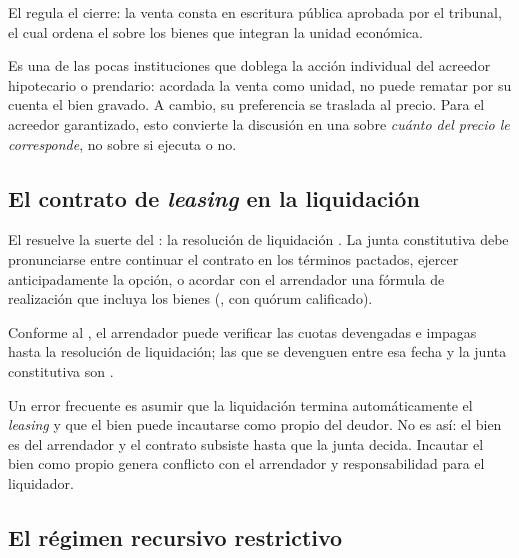 El  regula el cierre: la venta consta en escritura pública aprobada por el tribunal, el
cual ordena el  sobre
los bienes que integran la unidad económica.

\begin{foco}
Es una de las pocas instituciones que doblega la acción individual del acreedor hipotecario o
prendario: acordada la venta como unidad, no puede rematar por su cuenta el bien gravado. A
cambio, su preferencia se traslada al precio. Para el acreedor garantizado, esto convierte la
discusión en una sobre \emph{cuánto del precio le corresponde}, no sobre si ejecuta o no.
\end{foco}

\subsection{El contrato de \emph{leasing} en la liquidación}

El  resuelve la suerte del : la resolución
de liquidación . La junta constitutiva debe
pronunciarse entre continuar el contrato en los términos pactados, ejercer anticipadamente la
opción, o acordar con el arrendador una fórmula de realización que incluya los bienes (,
con quórum calificado).

Conforme al , el arrendador puede verificar las cuotas devengadas e impagas hasta la
resolución de liquidación; las que se devenguen entre esa fecha y la junta constitutiva son
.

\begin{alerta}
Un error frecuente es asumir que la liquidación termina automáticamente el \emph{leasing} y que
el bien puede incautarse como propio del deudor. No es así: el bien es del arrendador y el
contrato subsiste hasta que la junta decida. Incautar el bien como propio genera conflicto con
el arrendador y responsabilidad para el liquidador.
\end{alerta}

\subsection{El régimen recursivo restrictivo}

